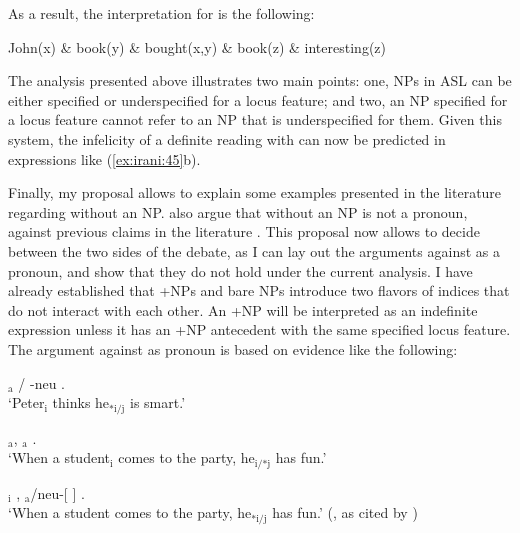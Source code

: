 \documentclass[output=paper,
modfonts
]{langscibook}
\begin{document}
As a result, the interpretation for  is the following:

\begin{exe}

\ex John(x) \& book(y) \& bought(x,y) \& book(z) \& interesting(z) 

\end{exe}

The analysis presented above illustrates two main points: one, NPs in ASL can be either specified or underspecified for a locus feature; and two, an NP specified for a locus feature cannot refer to an NP that is underspecified for them. Given this system, the infelicity of a definite reading with  can now be predicted in expressions like (\ref{ex:irani:45}b). 

Finally, my proposal allows to explain some examples presented in the literature regarding  without an NP. \citet{KoulidobrovaLilloMartin2016} also argue that  without an NP is not a pronoun, against previous claims in the literature \citep{Kuhn2015}. This proposal now allows to decide between the two sides of the debate, as I can lay out the arguments against  as a pronoun, and show that they do not hold under the current analysis. I have already established that +NPs and bare NPs introduce two flavors of indices that do not interact with each other. An +NP will be interpreted as an indefinite expression unless it has an +NP antecedent with the same specified locus feature. The argument against  as pronoun is based on evidence like the following: 

\begin{exe} 
	\ex \label{ex:irani:66}  $_\text{a}$ / -neu . \\
	`Peter$_\text{i}$ thinks he$_\text{*i/j}$ is smart.' \citep[241]{KoulidobrovaLilloMartin2016}
\end{exe} 

\begin{exe} 
	\ex \label{ex:irani:67}
	\begin{xlist} 
		\ex \label{ex:irani:67a}  $_\text{a}$, $_\text{a}$ .\\
		`When a student$_\text{i}$ comes to the party, he$_\text{i/*j}$ has fun.’  
		
		\ex  {}$_\text{i}$ , $_\text{a}$/neu-[ ] .\\
		`When a student comes to the party, he$_\text{*i/j}$ has fun.’ (\citealt[18]{Schlenker2010}, as cited by \citealt[242]{KoulidobrovaLilloMartin2016})
	\end{xlist}     
\end{exe} 
\end{document}

